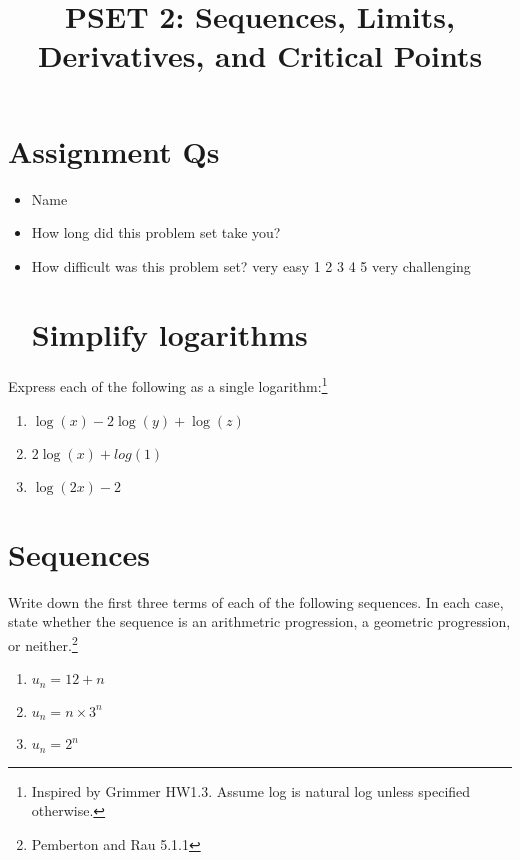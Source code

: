 \documentclass[
  letterpaper,
  DIV=11,
  numbers=noendperiod]{scrartcl}
\title{PSET 2: Sequences, Limits, Derivatives, and Critical Points}
\author{}
\date{}
\begin{document}
\maketitle
\ifdefined\Shaded\renewenvironment{Shaded}{\begin{tcolorbox}[interior hidden, borderline west={3pt}{0pt}{shadecolor}, boxrule=0pt, enhanced, breakable, sharp corners, frame hidden]}{\end{tcolorbox}}\fi

\hypertarget{assignment-qs}{%
\section{Assignment Qs}\label{assignment-qs}}

\begin{itemize}
\item
  Name
\item
  How long did this problem set take you?
\item
  How difficult was this problem set? very easy 1 2 3 4 5 very
  challenging

  \hypertarget{simplify-logarithms}{%
  \section{Simplify logarithms}\label{simplify-logarithms}}
\end{itemize}

Express each of the following as a single logarithm:\footnote{Inspired
  by Grimmer HW1.3. Assume log is natural log unless specified
  otherwise.}

\begin{enumerate}
\def\labelenumi{\alph{enumi}.}
\item
  \(\log(x) - 2\log(y) + \log(z)\)
\item
  \(2 \log(x) + log(1)\)
\item
  \(\log(2x) - 2\)
\end{enumerate}

\hypertarget{sequences}{%
\section{Sequences}\label{sequences}}

Write down the first three terms of each of the following sequences. In
each case, state whether the sequence is an arithmetric progression, a
geometric progression, or neither.\footnote{Pemberton and Rau 5.1.1}

\begin{enumerate}
\def\labelenumi{\alph{enumi}.}
\item
  \(u_n = 12 + n\)
\item
  \(u_n = n \times 3^n\)
\item
  \(u_n = 2^n\)
\end{enumerate}
\end{document}
